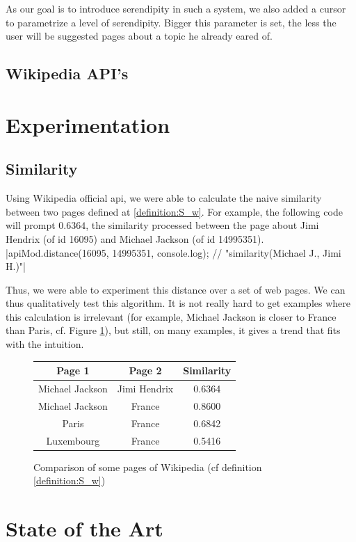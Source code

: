 \documentclass[11pt]{article}
\theoremstyle{plain}
\theoremstyle{definition}
\theoremstyle{remark}
\begin{document}
As our goal is to introduce serendipity in such a system, we also added a cursor to parametrize a level of serendipity. Bigger this parameter is set, the less the user will be suggested pages about a topic he already eared of.

\subsection{Wikipedia API's}


\section{Experimentation}
\subsection{Similarity}
Using Wikipedia official api, we were able to calculate the naive similarity between two pages defined at \ref{definition:S_w}. For example, the following code will prompt $0.6364$, the similarity processed between the page about Jimi Hendrix (of id 16095) and Michael Jackson (of id 14995351).
  |apiMod.distance(16095, 14995351, console.log); // "similarity(Michael J.,  Jimi H.)"|
  
Thus, we were able to experiment this distance over a set of web pages. We can thus qualitatively test this algorithm. It is not really hard to get examples where this calculation is irrelevant (for example, Michael Jackson is closer to France than Paris, cf. Figure \ref{fig:similarity}), but still, on many examples, it gives a trend that fits with the intuition.

\begin{figure}
    \caption{Comparison of some pages of Wikipedia (cf definition \ref{definition:S_w})}
    \label{fig:similarity}
	\centering
	\begin{tabular}{c|c|c}
		Page 1			&	Page 2			&	Similarity \\
		\hline\hline
		Michael Jackson	&	Jimi Hendrix	&	0.6364	\\
		Michael Jackson	&	France			&	0.8600	\\
		Paris			&	France			&	0.6842	\\
		Luxembourg		&	France			&	0.5416	\\
  \end{tabular}
\end{figure}


\section{State of the Art}






\end{document}
